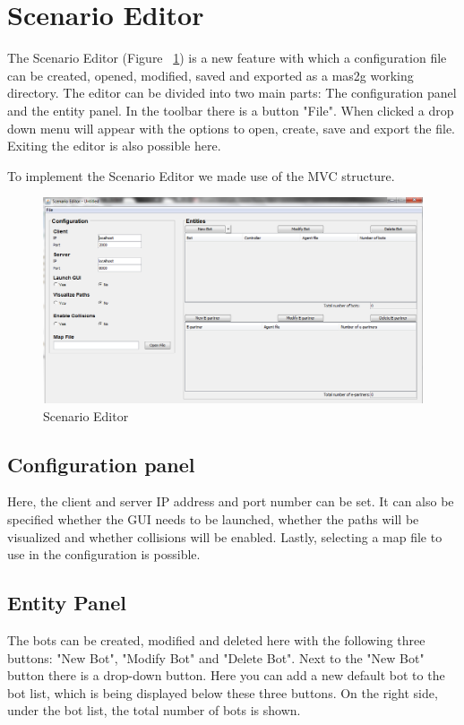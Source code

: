 \section{Scenario Editor}

The Scenario Editor (Figure ~\ref{fig:scenarioEditor}) is a new feature with which a configuration file can be created, opened, modified, saved and exported as a mas2g working directory. The editor can be divided into two main parts: The configuration panel and the entity panel.
In the toolbar there is a button "File". When clicked a drop down menu will appear with the options to open, create, save and export the file. Exiting the editor is also possible here.

To implement the Scenario Editor we made use of the MVC structure.

\begin{figure}
\includegraphics[width=\textwidth]{pictures/scenario-editor.png}
\caption{Scenario Editor}
\label{fig:scenarioEditor}
\end{figure}

\subsection*{Configuration panel}
Here, the client and server IP address and port number can be set. It can also be specified whether the GUI needs to be launched, whether the paths will be visualized and whether collisions will be enabled. Lastly, selecting a map file to use in the configuration is possible.

\subsection*{Entity Panel}
The bots can be created, modified and deleted here with the following three buttons: "New Bot", "Modify Bot" and "Delete Bot". Next to the "New Bot" button there is a drop-down button. Here you can add a new default bot to the bot list, which is being displayed below these three buttons. On the right side, under the bot list, the total number of bots is shown.


